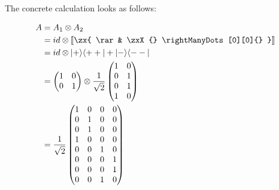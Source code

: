 The concrete calculation looks as follows:


\begin{align*}
    A    & = A_1 \otimes A_2                      \\
         & = id \otimes \left \llbracket
    \zx{
    \rar & \zxX{} \rightManyDots[0][0]{}
    } \right \rrbracket                           \\
         & =id    \otimes
    |+\rangle \langle ++| + |-\rangle \langle --| \\
         & = \begin{pmatrix}
                 1 & 0 \\
                 0 & 1 \\
             \end{pmatrix}
    \otimes
    \frac{1}{\sqrt{2}}
    \begin{pmatrix}
        1 & 0 \\
        0 & 1 \\
        0 & 1 \\
        1 & 0 \\
    \end{pmatrix}                                \\
         & = \frac{1}{\sqrt{2}}
    \begin{pmatrix}
        1 & 0 & 0 & 0 \\
        0 & 1 & 0 & 0 \\
        0 & 1 & 0 & 0 \\
        1 & 0 & 0 & 0 \\
        0 & 0 & 1 & 0 \\
        0 & 0 & 0 & 1 \\
        0 & 0 & 0 & 1 \\
        0 & 0 & 1 & 0 \\
    \end{pmatrix}
\end{align*}

